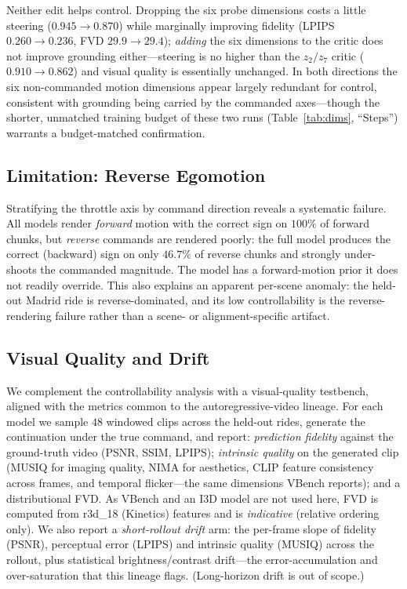 \documentclass[letterpaper]{article} %
\begin{document}
\noindent Neither edit helps control. Dropping the six probe dimensions costs a little steering ($0.945\!\to\!0.870$) while marginally improving fidelity (LPIPS $0.260\!\to\!0.236$, FVD $29.9\!\to\!29.4$); \emph{adding} the six dimensions to the critic does not improve grounding either---steering is no higher than the $z_2/z_7$ critic ($0.910\!\to\!0.862$) and visual quality is essentially unchanged. In both directions the six non-commanded motion dimensions appear largely redundant for control, consistent with grounding being carried by the commanded axes---though the shorter, unmatched training budget of these two runs (Table~\ref{tab:dims}, ``Steps'') warrants a budget-matched confirmation.

\subsection{Limitation: Reverse Egomotion}
Stratifying the throttle axis by command direction reveals a systematic failure. All models render \emph{forward} motion with the correct sign on $100\%$ of forward chunks, but \emph{reverse} commands are rendered poorly: the full model produces the correct (backward) sign on only $46.7\%$ of reverse chunks and strongly under-shoots the commanded magnitude. The model has a forward-motion prior it does not readily override. This also explains an apparent per-scene anomaly: the held-out Madrid ride is reverse-dominated, and its low controllability is the reverse-rendering failure rather than a scene- or alignment-specific artifact.

\subsection{Visual Quality and Drift}
We complement the controllability analysis with a visual-quality testbench, aligned with the metrics common to the autoregressive-video lineage. For each model we sample $48$ windowed clips across the held-out rides, generate the continuation under the true command, and report: \emph{prediction fidelity} against the ground-truth video (PSNR, SSIM, LPIPS); \emph{intrinsic quality} on the generated clip (MUSIQ for imaging quality, NIMA for aesthetics, CLIP feature consistency across frames, and temporal flicker---the same dimensions VBench reports); and a distributional FVD. As VBench and an I3D model are not used here, FVD is computed from r3d\_18 (Kinetics) features and is \emph{indicative} (relative ordering only). We also report a \emph{short-rollout drift} arm: the per-frame slope of fidelity (PSNR), perceptual error (LPIPS) and intrinsic quality (MUSIQ) across the rollout, plus statistical brightness/contrast drift---the error-accumulation and over-saturation that this lineage flags. (Long-horizon drift is out of scope.)
\end{document}
